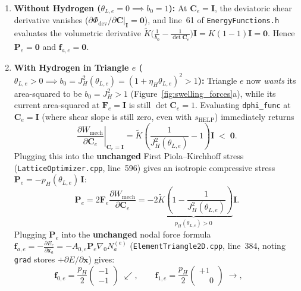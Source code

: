 \documentclass[11pt,a4paper]{article}
\newcommand{\code}[1]{\texttt{#1}}
\begin{document}
\begin{enumerate}[nosep]
  \item \textbf{Without Hydrogen ($\theta_{L,e} = 0 \implies b_0 = 1$):}
  At $\mathbf{C}_e = \mathbf{I}$, the deviatoric shear derivative vanishes ($\partial\Phi_{\mathrm{dev}}/\partial\mathbf{C}|_{\mathbf{I}}=\mathbf{0}$), and line~61 of \code{EnergyFunctions.h} evaluates the volumetric derivative $\tilde{K}\bigl(\frac{1}{b_0}-\frac{1}{\det\mathbf{C}_e}\bigr)\mathbf{I} = K(1-1)\mathbf{I} = \mathbf{0}$. Hence $\mathbf{P}_e = \mathbf{0}$ and $\mathbf{f}_{a,e} = \mathbf{0}$.
  \item \textbf{With Hydrogen in Triangle $e$ ($\theta_{L,e} > 0 \implies b_0 = J_H^2(\theta_{L,e}) = (1+\eta_H\theta_{L,e})^2 > 1$):}
  Triangle $e$ now \emph{wants} its area-squared to be $b_0 = J_H^2 > 1$ (Figure~\ref{fig:swelling_forces}a), while its current area-squared at $\mathbf{F}_e=\mathbf{I}$ is still $\det\mathbf{C}_e = 1$. Evaluating \code{dphi\_func} at $\mathbf{C}_e = \mathbf{I}$ (where shear slope is still zero, even with $s_{\mathrm{HELP}}$) immediately returns
  \begin{equation}
    \left.\frac{\partial W_{\mathrm{mech}}}{\partial \mathbf{C}_e}\right|_{\mathbf{C}_e=\mathbf{I}}
    = \tilde{K}\left(\frac{1}{J_H^2(\theta_{L,e})} - 1\right)\mathbf{I} \;<\; \mathbf{0}.
  \end{equation}
  Plugging this into the \textbf{unchanged} First Piola--Kirchhoff stress (\code{LatticeOptimizer.cpp}, line~596) gives an isotropic compressive stress $\mathbf{P}_e = -p_H(\theta_{L,e})\,\mathbf{I}$:
  \begin{equation}
    \mathbf{P}_e = 2\mathbf{F}_e \frac{\partial W_{\mathrm{mech}}}{\partial \mathbf{C}_e}
    = -\underbrace{2\tilde{K}\left(1 - \frac{1}{J_H^2(\theta_{L,e})}\right)}_{\displaystyle p_H(\theta_{L,e}) > 0}\mathbf{I}.
  \end{equation}
  Plugging $\mathbf{P}_e$ into the \textbf{unchanged} nodal force formula $\mathbf{f}_{a,e} = -\frac{\partial E_e}{\partial\mathbf{x}_a} = -A_{0,e}\mathbf{P}_e\nabla_0 N_a^{(e)}$ (\code{ElementTriangle2D.cpp}, line~384, noting \code{grad} stores $+\partial E/\partial\mathbf{x}$) gives:
  \begin{equation}
    \mathbf{f}_{0,e} = \frac{p_H}{2}\begin{pmatrix}-1\\-1\end{pmatrix}\;\swarrow, \qquad
    \mathbf{f}_{1,e} = \frac{p_H}{2}\begin{pmatrix}+1\\\phantom{+}0\end{pmatrix}\;\rightarrow, \qquad

\end{equation}
\end{enumerate}
\end{document}
